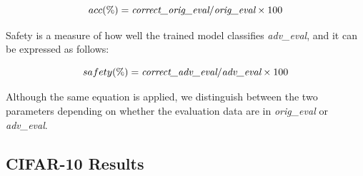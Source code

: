 \documentclass[journal,article,submit,moreauthors,pdftex]{Definitions/mdpi}
\begin{document}
\begin{equation}
    acc(\%) = \text{{\it correct\_orig\_eval}} / \text{{\it orig\_eval}} \times 100
\end{equation} 

Safety is a measure of how well the trained model classifies {\it adv\_eval}, and it can be expressed as follows:

\begin{equation}
    safety(\%) = \text{{\it correct\_adv\_eval}} / \text{{\it adv\_eval}} \times 100
\end{equation}

Although the same equation is applied, we distinguish between the two parameters depending on whether the evaluation data are in {\it orig\_eval} or {\it adv\_eval}.

\subsection{CIFAR-10 Results}
\end{document}
